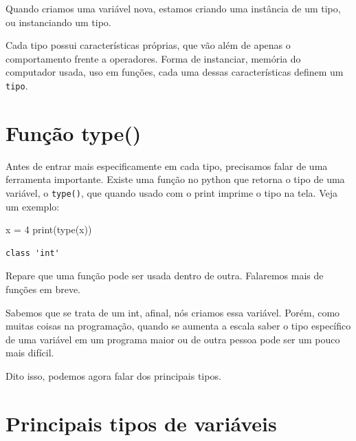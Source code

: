 \documentclass[
  letterpaper,
  DIV=11,
  numbers=noendperiod]{scrreprt}
\newenvironment{Shaded}{\begin{snugshade}}{\end{snugshade}}
\newcommand{\BuiltInTok}[1]{\textcolor[rgb]{0.00,0.23,0.31}{#1}}
\newcommand{\DecValTok}[1]{\textcolor[rgb]{0.68,0.00,0.00}{#1}}
\newcommand{\NormalTok}[1]{\textcolor[rgb]{0.00,0.23,0.31}{#1}}
\newcommand{\OperatorTok}[1]{\textcolor[rgb]{0.37,0.37,0.37}{#1}}
\begin{document}
Quando criamos uma variável nova, estamos criando uma instância de um
tipo, ou instanciando um tipo.

Cada tipo possui características próprias, que vão além de apenas o
comportamento frente a operadores. Forma de instanciar, memória do
computador usada, uso em funções, cada uma dessas características
definem um \texttt{tipo}.

\hypertarget{funuxe7uxe3o-type}{%
\section{Função type()}\label{funuxe7uxe3o-type}}

Antes de entrar mais especificamente em cada tipo, precisamos falar de
uma ferramenta importante. Existe uma função no python que retorna o
tipo de uma variável, o \texttt{type()}, que quando usado com o print
imprime o tipo na tela. Veja um exemplo:

\begin{Shaded}
\begin{Highlighting}[]
\NormalTok{x }\OperatorTok{=} \DecValTok{4}
\BuiltInTok{print}\NormalTok{(}\BuiltInTok{type}\NormalTok{(x))}
\end{Highlighting}
\end{Shaded}

\begin{tcolorbox}[enhanced jigsaw, breakable, leftrule=.75mm, left=2mm, opacityback=0, bottomrule=.15mm, toprule=.15mm, rightrule=.15mm, arc=.35mm, colback=white]

\begin{verbatim}
class 'int'
\end{verbatim}

\end{tcolorbox}

Repare que uma função pode ser usada dentro de outra. Falaremos mais de
funções em breve.

Sabemos que se trata de um int, afinal, nós criamos essa variável.
Porém, como muitas coisas na programação, quando se aumenta a escala
saber o tipo específico de uma variável em um programa maior ou de outra
pessoa pode ser um pouco mais difícil.

Dito isso, podemos agora falar dos principais tipos.

\hypertarget{principais-tipos-de-variuxe1veis}{%
\section{Principais tipos de
variáveis}\label{principais-tipos-de-variuxe1veis}}
\end{document}
